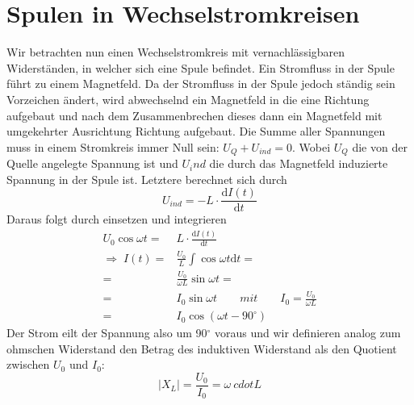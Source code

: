 \documentclass[10pt,a4paper,twoside]{article}
\newcommand{\degree}{$^\circ$}
\begin{document}
\section{Spulen in Wechselstromkreisen}
Wir betrachten nun einen Wechselstromkreis mit vernachlässigbaren Widerständen, in welcher sich eine Spule befindet. Ein Stromfluss in der Spule führt zu einem Magnetfeld. Da der Stromfluss in der Spule jedoch ständig sein Vorzeichen ändert, wird abwechselnd ein Magnetfeld in die eine Richtung aufgebaut und nach dem Zusammenbrechen dieses dann ein Magnetfeld mit umgekehrter Ausrichtung Richtung aufgebaut.
Die Summe aller Spannungen muss in einem Stromkreis immer Null sein:
$ U_Q + U_{ind} = 0 $.
Wobei $U_Q$ die von der Quelle angelegte Spannung ist und $U_ind$ die durch das Magnetfeld induzierte Spannung in der Spule ist. Letztere berechnet sich durch
\begin{equation}
U_{ind} = - L \cdot \frac{\mathrm dI(t)}{\mathrm dt}
\end{equation}
Daraus folgt durch einsetzen und integrieren
\begin{align}
U_0 \cos \omega t =& L \cdot \frac{\mathrm dI(t)}{\mathrm dt} \nonumber \\ 
\Rightarrow\; I(t) =& \frac{U_0}{L} \int \cos \omega t \mathrm dt = \nonumber \\ 
=& \frac{U_0}{\omega L} \sin \omega t = \nonumber\\
=& I_0 \sin \omega t \qquad mit\qquad I_0 = \frac{U_0}{\omega L}  \nonumber\\
=& I_0 \cos(\omega t - 90^\circ)
\end{align}
Der Strom eilt der Spannung also um \unit{90}{\degree} voraus und wir definieren analog zum ohmschen Widerstand den Betrag des induktiven Widerstand als den Quotient zwischen $U_0$ und $I_0$:
\begin{equation}
\left|X_L\right| = \frac{U_0}{I_0} = \omega \ cdot L
\end{equation}
\end{document}
